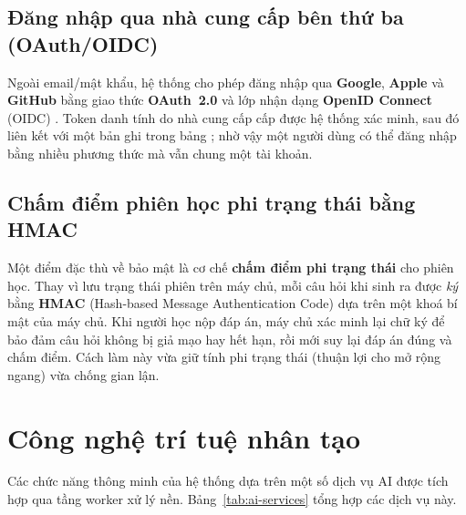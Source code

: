 \subsection{Đăng nhập qua nhà cung cấp bên thứ ba (OAuth/OIDC)}
\label{subsec:oauth}

Ngoài email/mật khẩu, hệ thống cho phép đăng nhập qua \textbf{Google},
\textbf{Apple} và \textbf{GitHub} bằng giao thức \textbf{OAuth~2.0} và lớp
nhận dạng \textbf{OpenID Connect} (OIDC) \cite{rfc6749}. Token danh tính do
nhà cung cấp cấp được hệ thống xác minh, sau đó liên kết với một bản ghi
trong bảng ; nhờ vậy một người dùng có thể đăng nhập
bằng nhiều phương thức mà vẫn chung một tài khoản.

\subsection{Chấm điểm phiên học phi trạng thái bằng HMAC}
\label{subsec:hmac}

Một điểm đặc thù về bảo mật là cơ chế \textbf{chấm điểm phi trạng thái} cho
phiên học. Thay vì lưu trạng thái phiên trên máy chủ, mỗi câu hỏi khi sinh
ra được \textit{ký} bằng \textbf{HMAC} (Hash-based Message Authentication
Code) \cite{rfc2104} dựa trên một khoá bí mật của máy chủ. Khi người học nộp
đáp án, máy chủ xác minh lại chữ ký để bảo đảm câu hỏi không bị giả mạo hay
hết hạn, rồi mới suy lại đáp án đúng và chấm điểm. Cách làm này vừa giữ tính
phi trạng thái (thuận lợi cho mở rộng ngang) vừa chống gian lận.

\section{Công nghệ trí tuệ nhân tạo}
\label{sec:cong-nghe-ai}

Các chức năng thông minh của hệ thống dựa trên một số dịch vụ AI được tích
hợp qua tầng worker xử lý nền. Bảng~\ref{tab:ai-services} tổng hợp các dịch
vụ này.

